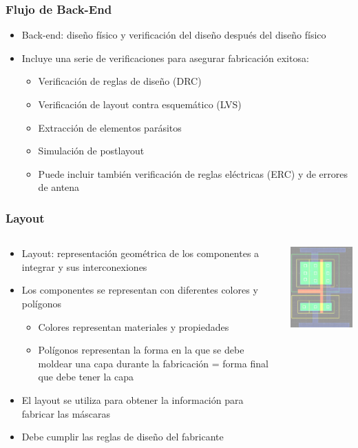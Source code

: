 \documentclass[aspectratio=169,10pt]{beamer}
\begin{document}
\begin{frame}[t]
\frametitle{Flujo de Back-End}

\begin{itemize}
\item Back-end: diseño físico y verificación del diseño después del diseño físico
\item Incluye una serie de verificaciones para asegurar fabricación exitosa:
\begin{itemize}
\item Verificación de reglas de diseño (DRC)
\item Verificación de layout contra esquemático (LVS)
\item Extracción de elementos parásitos
\item Simulación de postlayout
\item Puede incluir también verificación de reglas eléctricas (ERC) y de errores de antena
\end{itemize}
\end{itemize}
\end{frame}


\begin{frame}[t]
\frametitle{Layout}
\begin{columns}
	\begin{column}{0.5\textwidth}
		\begin{itemize}
			\item Layout: representación geométrica de los componentes a integrar y sus interconexiones
			\item Los componentes se representan con diferentes colores y polígonos
			\begin{itemize}
				\item Colores representan materiales y propiedades
				\item Polígonos representan la forma en la que se debe moldear una capa durante la fabricación = forma final que debe tener la capa
			\end{itemize}
			\item El layout se utiliza para obtener la información para fabricar las máscaras
			\item Debe cumplir las reglas de diseño del fabricante
		\end{itemize}
	\end{column}
	\begin{column}{0.5\textwidth}
		\centering
		\includegraphics[width=5cm]{layout}
	\end{column}
\end{columns}
\end{frame}
\end{document}
